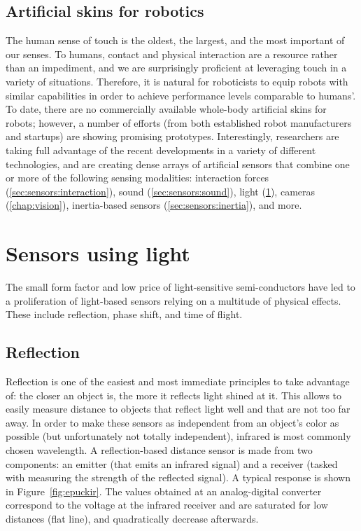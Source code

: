 \subsection{Artificial skins for robotics}

The human sense of touch is the oldest, the largest, and the most important of our senses.
To humans, contact and physical interaction are a resource rather than an impediment, and we are surprisingly proficient at leveraging touch in a variety of situations.
Therefore, it is natural for roboticists to equip robots with similar capabilities in order to achieve performance levels comparable to humans'.
To date, there are no commercially available whole-body artificial skins for robots; however, a number of efforts (from both established robot manufacturers and startups) are showing promising prototypes.
Interestingly, researchers are taking full advantage of the recent developments in a variety of different technologies, and are creating dense arrays of artificial sensors that combine one or more of the following sensing modalities: interaction forces (\cref{sec:sensors:interaction}), sound (\cref{sec:sensors:sound}), light (\cref{sec:sensors:light}), cameras (\cref{chap:vision}), inertia-based sensors (\cref{sec:sensors:inertia}), and more.

\section{Sensors using light}\label{sec:sensors:light}

The small form factor and low price of light-sensitive semi-conductors have led to a proliferation of light-based sensors relying on a multitude of physical effects. These include reflection, phase shift, and time of flight.

\subsection{Reflection}
Reflection is one of the easiest and most immediate principles to take advantage of: the closer an object is, the more it reflects light shined at it. This allows to easily measure distance to objects that reflect light well and that are not too far away. In order to make these sensors as independent from an object's color as possible (but unfortunately not totally independent), infrared is most commonly chosen wavelength.
A reflection-based distance sensor is made from two components: an emitter (that emits an infrared signal) and a receiver (tasked with measuring the strength of the reflected signal). A typical response is shown in Figure~\ref{fig:epuckir}. The values obtained at an analog-digital converter correspond to the voltage at the infrared receiver and are saturated for low distances (flat line), and quadratically decrease afterwards.

